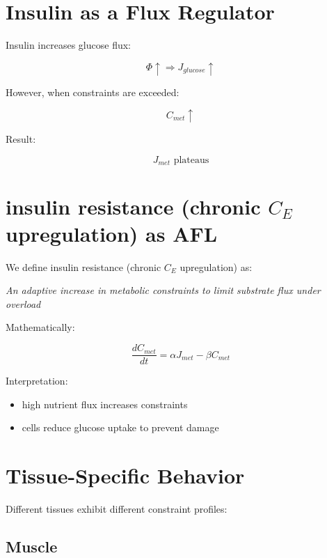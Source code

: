 \documentclass[12pt,a4paper]{article}
\begin{document}
\section{Insulin as a Flux Regulator}

Insulin increases glucose flux:

\begin{equation}
\Phi \uparrow \Rightarrow J_{glucose} \uparrow
\end{equation}

However, when constraints are exceeded:

\begin{equation}
C_{met} \uparrow
\end{equation}

Result:

\begin{equation}
J_{met} \text{ plateaus}
\end{equation}

\section{insulin resistance (chronic $C_E$ upregulation) as AFL}

We define insulin resistance (chronic $C_E$ upregulation) as:

\begin{center}
\textit{An adaptive increase in metabolic constraints to limit substrate flux under overload}
\end{center}

Mathematically:

\begin{equation}
\frac{dC_{met}}{dt} = \alpha J_{met} - \beta C_{met}
\end{equation}

Interpretation:

\begin{itemize}
    \item high nutrient flux increases constraints
    \item cells reduce glucose uptake to prevent damage
\end{itemize}

\section{Tissue-Specific Behavior}

Different tissues exhibit different constraint profiles:

\subsection{Muscle}
\end{document}
